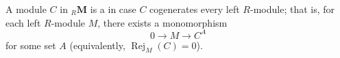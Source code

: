 A module $C$ in ${}_R\mathbf{M}$ is a  in case $C$ cogenerates every left $R$-module; that is, for each left $R$-module $M$, there exists a monomorphism
$$0 \to M \to C^A$$
for some set $A$ (equivalently, $\operatorname{Rej}_M(C) = 0$).
